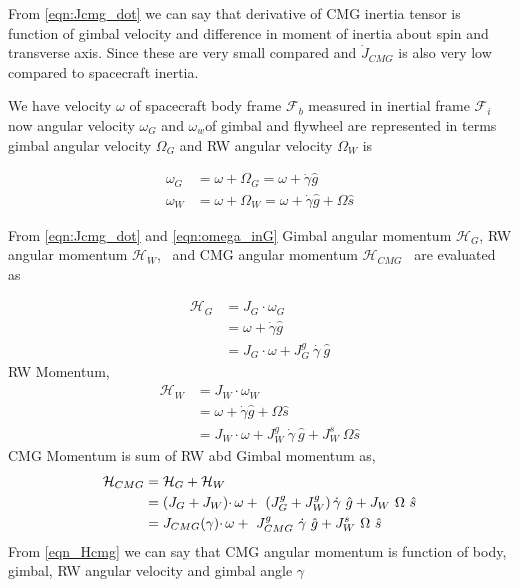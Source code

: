 From \autoref{eqn:Jcmg_dot} we can say that derivative of CMG inertia tensor is function of gimbal velocity and difference in moment of inertia about spin and transverse axis. Since these are very small compared and $\displaystyle \dot{J}_{CMG}$ is also very low compared to spacecraft inertia.

We have velocity $\displaystyle \omega $ of spacecraft body frame $\displaystyle \mathcal{F}_{b}$ measured in inertial frame $\displaystyle \mathcal{F}_{i}$ now angular velocity $\displaystyle \omega _{G}$ and $\displaystyle \omega_{w}$of gimbal and flywheel are represented in terms  gimbal angular velocity $\displaystyle \Omega_{G}$ and RW angular velocity $\displaystyle \Omega _{W}$ is


\begin{equation}
\begin{aligned}
\omega _{G} & =\omega +\Omega _{G} =\omega +\dot{\gamma }\hat{g}\\
\omega _{W} & =\omega +\Omega _{W} =\omega +\dot{\gamma }\hat{g} +\Omega \hat{s}
\end{aligned}
\label{eqn:omega_inG}
\end{equation}

From \autoref{eqn:Jcmg_dot} and \autoref{eqn:omega_inG} Gimbal angular momentum $\displaystyle\mathcal{H}_{G}$, RW angular momentum $\displaystyle \mathcal{H}_{W}$, \ and CMG angular momentum $\displaystyle \mathcal{H}_{CMG}$ \ are evaluated as


\begin{equation}
\begin{aligned}
\mathcal{H}_{G} & =J_{G} \cdotp \omega _{G}\\
 & =\omega +\dot{\gamma }\hat{g}\\
 & =J_{G} \cdotp \omega +J^{g}_{G} \ \dot{\gamma \ }\hat{g}
\end{aligned}
\end{equation}
RW Momentum,
\begin{equation}
\begin{aligned}
\mathcal{H}_{W} & =J_{W} \cdotp \omega _{W}\\
 & =\omega +\dot{\gamma }\hat{g} +\Omega \hat{s}\\
 & =J_{W} \cdotp \omega +J^{g}_{W} \ \dot{\gamma } \ \hat{g} +J^s_{W} \ \Omega \hat{s}
\end{aligned}
\end{equation}
CMG Momentum is sum of RW abd Gimbal momentum as,
\begin{equation}
\begin{aligned}
\mathcal{H}_{CMG} & =\mathcal{H}_{G} +\mathcal{H}_{W}\\
 & =( J_{G} +J_{W}) \cdotp \omega +\ \left( J^{g}_{G} +J^{g}_{W}\right)\dot{\gamma } \ \hat{g} +J_{W} \ \Omega \ \hat{s}\\
 & =J_{CMG}( \gamma ) \cdotp \omega +\ J^{g}_{CMG} \ \dot{\gamma } \ \hat{g} +J^s_{W} \ \Omega \ \hat{s}
\end{aligned}\\
\label{eqn_Hcmg}
\end{equation}
From \autoref{eqn_Hcmg} we can say that CMG angular momentum is function of body, gimbal, RW angular velocity and gimbal angle $\gamma$

